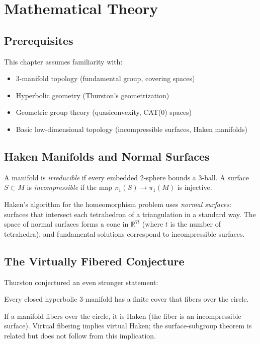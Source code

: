 \section{Mathematical Theory}


\subsection{Prerequisites}
This chapter assumes familiarity with:
\begin{itemize}
\item 3-manifold topology (fundamental group, covering spaces)
\item Hyperbolic geometry (Thurston's geometrization)
\item Geometric group theory (quasiconvexity, CAT(0) spaces)
\item Basic low-dimensional topology (incompressible surfaces, Haken manifolds)
\end{itemize}

\subsection{Haken Manifolds and Normal Surfaces}
A manifold is \emph{irreducible} if every embedded 2-sphere bounds a 3-ball. A surface $S \subset M$ is \emph{incompressible} if the map $\pi_1(S) \to \pi_1(M)$ is injective.

Haken's algorithm for the homeomorphism problem uses \emph{normal surfaces}: surfaces that intersect each tetrahedron of a triangulation in a standard way. The space of normal surfaces forms a cone in $\mathbb{R}^{7t}$ (where $t$ is the number of tetrahedra), and fundamental solutions correspond to incompressible surfaces.

\subsection{The Virtually Fibered Conjecture}
Thurston conjectured an even stronger statement:

\begin{conjecture}
Every closed hyperbolic 3-manifold has a finite cover that fibers over the circle.
\end{conjecture}

If a manifold fibers over the circle, it is Haken (the fiber is an incompressible surface). Virtual fibering implies virtual Haken; the surface-subgroup theorem is related but does not follow from this implication.

